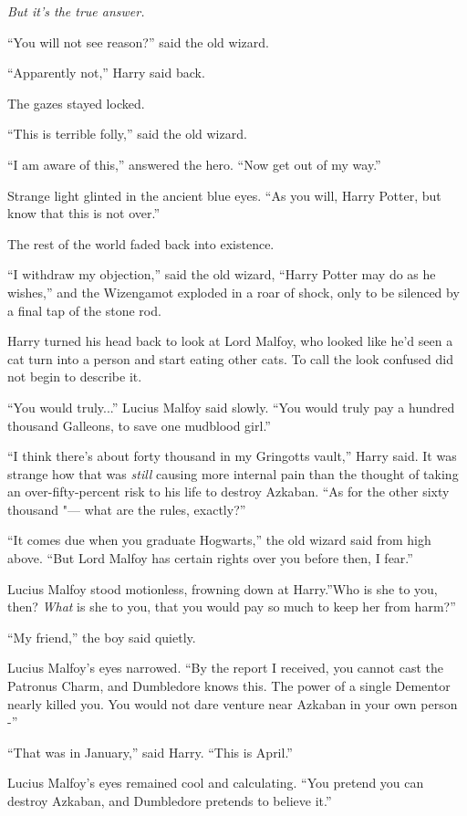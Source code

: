 \emph{But it's the true answer.}

``You will not see reason?'' said the old wizard.

``Apparently not,'' Harry said back.

The gazes stayed locked.

``This is terrible folly,'' said the old wizard.

``I am aware of this,'' answered the hero. ``Now get out of my way.''

Strange light glinted in the ancient blue eyes. ``As you will, Harry
Potter, but know that this is not over.''

The rest of the world faded back into existence.

``I withdraw my objection,'' said the old wizard, ``Harry Potter may do
as he wishes,'' and the Wizengamot exploded in a roar of shock, only to
be silenced by a final tap of the stone rod.

Harry turned his head back to look at Lord Malfoy, who looked like he'd
seen a cat turn into a person and start eating other cats. To call the
look confused did not begin to describe it.

``You would truly...'' Lucius Malfoy said slowly. ``You would truly
pay a hundred thousand Galleons, to save one mudblood girl.''

``I think there's about forty thousand in my Gringotts vault,'' Harry
said. It was strange how that was \emph{still} causing more internal
pain than the thought of taking an over-fifty-percent risk to his life
to destroy Azkaban. ``As for the other sixty thousand "--- what are the
rules, exactly?''

``It comes due when you graduate Hogwarts,'' the old wizard said from
high above. ``But Lord Malfoy has certain rights over you before then, I
fear.''

Lucius Malfoy stood motionless, frowning down at Harry.''Who is she to
you, then? \emph{What} is she to you, that you would pay so much to keep
her from harm?''

``My friend,'' the boy said quietly.

Lucius Malfoy's eyes narrowed. ``By the report I received, you cannot
cast the Patronus Charm, and Dumbledore knows this. The power of a
single Dementor nearly killed you. You would not dare venture near
Azkaban in your own person -''

``That was in January,'' said Harry. ``This is April.''

Lucius Malfoy's eyes remained cool and calculating. ``You pretend you
can destroy Azkaban, and Dumbledore pretends to believe it.''

